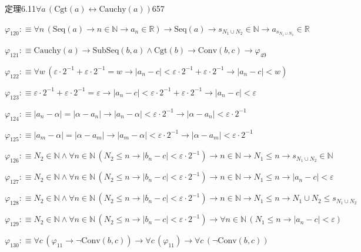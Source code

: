 \begin{fullproof}{定理6.11}{$\forall a\,(\mathrm{Cgt}(a) \leftrightarrow \mathrm{Cauchy}(a))$}{657}
\begin{abbrevlist}
\item $\varphi_{120} :\equiv \forall n\,(\mathrm{Seq}(a) \to n \in \mathbb{N} \to a_{n} \in \mathbb{R}) \to \mathrm{Seq}(a) \to s_{N_{1} \cup N_{2}} \in \mathbb{N} \to a_{s_{N_{1} \cup N_{2}}} \in \mathbb{R}$
\item $\varphi_{121} :\equiv \mathrm{Cauchy}(a) \to \mathrm{SubSeq}(b,a) \land \mathrm{Cgt}(b) \to \mathrm{Conv}(b,c) \to \varphi_{49}$
\item $\varphi_{122} :\equiv \forall w\,(\varepsilon \cdot 2^{-1} + \varepsilon \cdot 2^{-1} = w \to \lvert a_{n} - c \rvert < \varepsilon \cdot 2^{-1} + \varepsilon \cdot 2^{-1} \to \lvert a_{n} - c \rvert < w)$
\item $\varphi_{123} :\equiv \varepsilon \cdot 2^{-1} + \varepsilon \cdot 2^{-1} = \varepsilon \to \lvert a_{n} - c \rvert < \varepsilon \cdot 2^{-1} + \varepsilon \cdot 2^{-1} \to \lvert a_{n} - c \rvert < \varepsilon$
\item $\varphi_{124} :\equiv \lvert a_{n} - \alpha \rvert = \lvert \alpha - a_{n} \rvert \to \lvert a_{n} - \alpha \rvert < \varepsilon \cdot 2^{-1} \to \lvert \alpha - a_{n} \rvert < \varepsilon \cdot 2^{-1}$
\item $\varphi_{125} :\equiv \lvert a_{m} - \alpha \rvert = \lvert \alpha - a_{m} \rvert \to \lvert a_{m} - \alpha \rvert < \varepsilon \cdot 2^{-1} \to \lvert \alpha - a_{m} \rvert < \varepsilon \cdot 2^{-1}$
\item $\varphi_{126} :\equiv N_{2} \in \mathbb{N} \land \forall n \in \mathbb{N}\,(N_{2} \leq n \to \lvert b_{n} - c \rvert < \varepsilon \cdot 2^{-1}) \to n \in \mathbb{N} \to N_{1} \leq n \to s_{N_{1} \cup N_{2}} \in \mathbb{N}$
\item $\varphi_{127} :\equiv N_{2} \in \mathbb{N} \land \forall n \in \mathbb{N}\,(N_{2} \leq n \to \lvert b_{n} - c \rvert < \varepsilon \cdot 2^{-1}) \to n \in \mathbb{N} \to N_{1} \leq n \to \lvert a_{n} - c \rvert < \varepsilon$
\item $\varphi_{128} :\equiv N_{2} \in \mathbb{N} \land \forall n \in \mathbb{N}\,(N_{2} \leq n \to \lvert b_{n} - c \rvert < \varepsilon \cdot 2^{-1}) \to n \in \mathbb{N} \to N_{1} \leq n \to N_{1} \cup N_{2} \leq s_{N_{1} \cup N_{2}}$
\item $\varphi_{129} :\equiv N_{2} \in \mathbb{N} \land \forall n \in \mathbb{N}\,(N_{2} \leq n \to \lvert b_{n} - c \rvert < \varepsilon \cdot 2^{-1}) \to \forall n \in \mathbb{N}\,(N_{1} \leq n \to \lvert a_{n} - c \rvert < \varepsilon)$
\item $\varphi_{130} :\equiv \forall c\,(\varphi_{11} \to \neg \mathrm{Conv}(b,c)) \to \forall c\,(\varphi_{11}) \to \forall c\,(\neg \mathrm{Conv}(b,c))$

\end{abbrevlist}
\end{fullproof}
